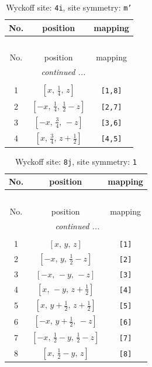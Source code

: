 \documentclass[fleqn,8pt]{jsarticle}
\begin{document}
\renewcommand{\arraystretch}{1.2}
\begin{longtable}{ccc}
\caption{Wyckoff site: {\tt 4i}, site symmetry: {\tt m'}}
 \\
 \hline \hline
No. & position & mapping \\ \hline \endfirsthead

\multicolumn{2}{l}{\tablename\ \thetable{}} \\
 \hline \hline
No. & position & mapping \\ \hline \endhead

 \hline \hline
\multicolumn{2}{r}{\footnotesize\it continued ...} \\ \endfoot

 \hline \hline
\multicolumn{2}{r}{} \\ \endlastfoot

1 & $\left[ x,\, \frac{1}{4},\, z \right]$ & {\tt [1,8]} \\ \hline
2 & $\left[ - x,\, \frac{1}{4},\, \frac{1}{2} - z \right]$ & {\tt [2,7]} \\ \hline
3 & $\left[ - x,\, \frac{3}{4},\, - z \right]$ & {\tt [3,6]} \\ \hline
4 & $\left[ x,\, \frac{3}{4},\, z + \frac{1}{2} \right]$ & {\tt [4,5]} \\
\end{longtable}
\renewcommand{\arraystretch}{1.2}
\begin{longtable}{ccc}
\caption{Wyckoff site: {\tt 8j}, site symmetry: {\tt 1}}
 \\
 \hline \hline
No. & position & mapping \\ \hline \endfirsthead

\multicolumn{2}{l}{\tablename\ \thetable{}} \\
 \hline \hline
No. & position & mapping \\ \hline \endhead

 \hline \hline
\multicolumn{2}{r}{\footnotesize\it continued ...} \\ \endfoot

 \hline \hline
\multicolumn{2}{r}{} \\ \endlastfoot

1 & $\left[ x,\, y,\, z \right]$ & {\tt [1]} \\ \hline
2 & $\left[ - x,\, y,\, \frac{1}{2} - z \right]$ & {\tt [2]} \\ \hline
3 & $\left[ - x,\, - y,\, - z \right]$ & {\tt [3]} \\ \hline
4 & $\left[ x,\, - y,\, z + \frac{1}{2} \right]$ & {\tt [4]} \\ \hline
5 & $\left[ x,\, y + \frac{1}{2},\, z + \frac{1}{2} \right]$ & {\tt [5]} \\ \hline
6 & $\left[ - x,\, y + \frac{1}{2},\, - z \right]$ & {\tt [6]} \\ \hline
7 & $\left[ - x,\, \frac{1}{2} - y,\, \frac{1}{2} - z \right]$ & {\tt [7]} \\ \hline
8 & $\left[ x,\, \frac{1}{2} - y,\, z \right]$ & {\tt [8]} \\
\end{longtable}
\end{document}
